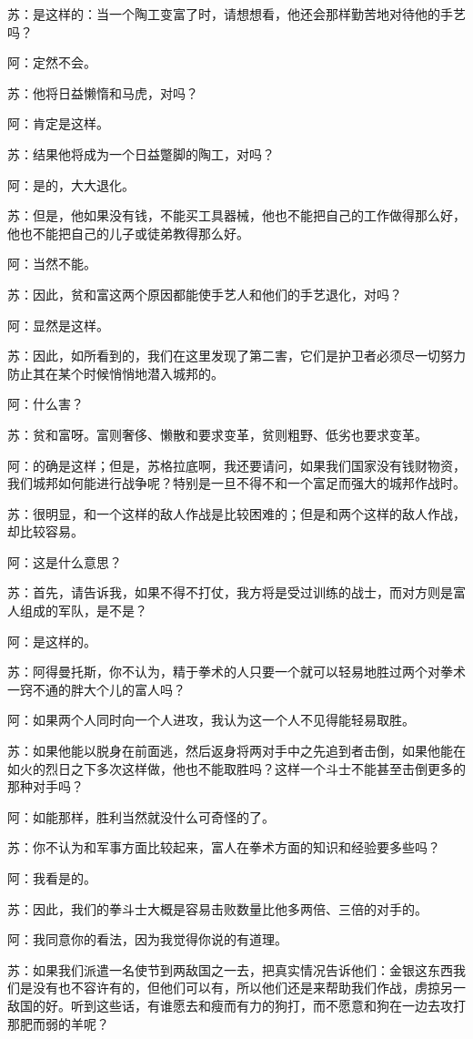 \documentclass[12pt,oneside]{book}
\begin{document}
苏：是这样的：当一个陶工变富了时，请想想看，他还会那样勤苦地对待他的手艺吗？

阿：定然不会。

苏：他将日益懒惰和马虎，对吗？

阿：肯定是这样。

苏：结果他将成为一个日益蹩脚的陶工，对吗？

阿：是的，大大退化。

苏：但是，他如果没有钱，不能买工具器械，他也不能把自己的工作做得那么好，他也不能把自己的儿子或徒弟教得那么好。

阿：当然不能。

苏：因此，贫和富这两个原因都能使手艺人和他们的手艺退化，对吗？

阿：显然是这样。

苏：因此，如所看到的，我们在这里发现了第二害，它们是护卫者必须尽一切努力防止其在某个时候悄悄地潜入城邦的。

阿：什么害？

苏：贫和富呀。富则奢侈、懒散和要求变革，贫则粗野、低劣也要求变革。

阿：的确是这样；但是，苏格拉底啊，我还要请问，如果我们国家没有钱财物资，我们城邦如何能进行战争呢？特别是一旦不得不和一个富足而强大的城邦作战时。

苏：很明显，和一个这样的敌人作战是比较困难的；但是和两个这样的敌人作战，却比较容易。

阿：这是什么意思？

苏：首先，请告诉我，如果不得不打仗，我方将是受过训练的战士，而对方则是富人组成的军队，是不是？

阿：是这样的。

苏：阿得曼托斯，你不认为，精于拳术的人只要一个就可以轻易地胜过两个对拳术一窍不通的胖大个儿的富人吗？

阿：如果两个人同时向一个人进攻，我认为这一个人不见得能轻易取胜。

苏：如果他能以脱身在前面逃，然后返身将两对手中之先追到者击倒，如果他能在如火的烈日之下多次这样做，他也不能取胜吗？这样一个斗士不能甚至击倒更多的那种对手吗？

阿：如能那样，胜利当然就没什么可奇怪的了。

苏：你不认为和军事方面比较起来，富人在拳术方面的知识和经验要多些吗？

阿：我看是的。

苏：因此，我们的拳斗士大概是容易击败数量比他多两倍、三倍的对手的。

阿：我同意你的看法，因为我觉得你说的有道理。

苏：如果我们派遣一名使节到两敌国之一去，把真实情况告诉他们：金银这东西我们是没有也不容许有的，但他们可以有，所以他们还是来帮助我们作战，虏掠另一敌国的好。听到这些话，有谁愿去和瘦而有力的狗打，而不愿意和狗在一边去攻打那肥而弱的羊呢？
\end{document}
